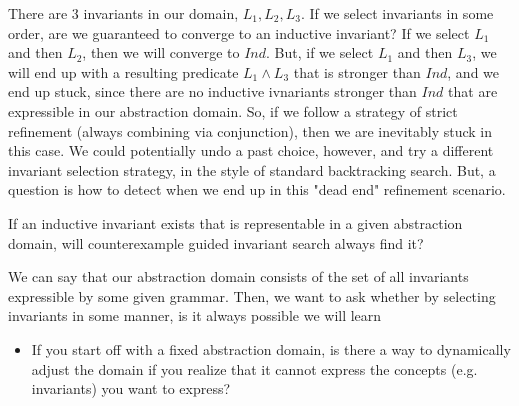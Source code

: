 \documentclass[10pt]{article}
\begin{document}
There are 3 invariants in our domain, $L_1,L_2,L_3$. If we select invariants in some order, are we guaranteed to converge to an inductive invariant? If we select $L_1$ and then $L_2$, then we will converge to $Ind$. But, if we select $L_1$ and then $L_3$, we will end up with a resulting predicate $L_1 \wedge L_3$ that is stronger than $Ind$, and we end up stuck, since there are no inductive ivnariants stronger than $Ind$ that are expressible in our abstraction domain. So, if we follow a strategy of strict refinement (always combining via conjunction), then we are inevitably stuck in this case. We could potentially undo a past choice, however, and try a different invariant selection strategy, in the style of standard backtracking search. But, a question is how to detect when we end up in this "dead end" refinement scenario.

If an inductive invariant exists that is representable in a given abstraction domain, will counterexample guided invariant search always find it?

We can say that our abstraction domain consists of the set of all invariants expressible by some given grammar. Then, we want to ask whether by selecting invariants in some manner, is it always possible we will learn

\begin{itemize}
    \item If you start off with a fixed abstraction domain, is there a way to dynamically adjust the domain if you realize that it cannot express the concepts (e.g. invariants) you want to express?
\end{itemize}







% 
% 

\end{document}

